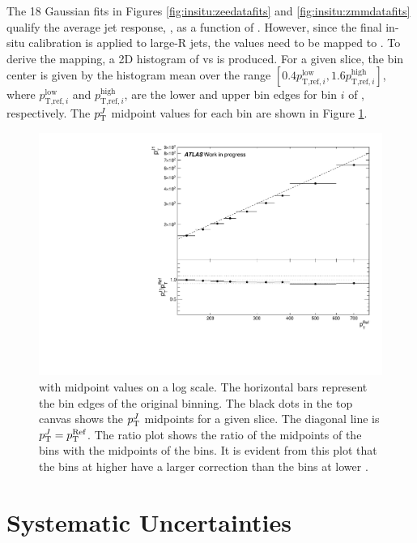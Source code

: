 The 18 Gaussian fits in Figures \ref{fig:insitu:zeedatafits} and \ref{fig:insitu:zmmdatafits} qualify the average jet response, \rdb, as a function of \ptref. However, since the final in-situ calibration is applied to large-R jets, the \ptref values need to be mapped to \ptJ. To derive the mapping, a 2D histogram of \ptref vs \ptJ is produced. For a given \ptref slice, the \ptJ bin center is given by the histogram mean over the range $[0.4p_{\text{T,ref},i}^{\text{low}},1.6p_{\text{T,ref},i}^{\text{high}}]$, where $p_{\text{T,ref},i}^{\text{low}}$ and $p_{\text{T,ref},i}^{\text{high}}$, are the lower and upper bin edges for bin $i$ of \ptref, respectively. The $p_{\text{T}}^J$ midpoint values for each \ptref bin are shown in Figure \ref{fig:insitu:mapping}.
\begin{figure}[t]
\centering
\includegraphics[width=\textwidth]{plots/insitu/Sherpa.all_MappingVsPt_WIP.pdf}    
\caption{\ptref with midpoint \ptJ values on a log scale. The horizontal bars represent the bin edges of the original \ptref binning. The black dots in the top canvas shows the $p_{\text{T}}^J$ midpoints for a given \ptref slice. The diagonal line is $p_{\text{T}}^J = p_{\text{T}}^{\text{Ref}}$. The ratio plot shows the ratio of the midpoints of the \ptJ bins with the midpoints of the \ptref bins. It is evident from this plot that the bins at higher \ptref have a larger correction than the bins at lower \ptref.\label{fig:insitu:mapping}}
\end{figure}

\section{Systematic Uncertainties}

